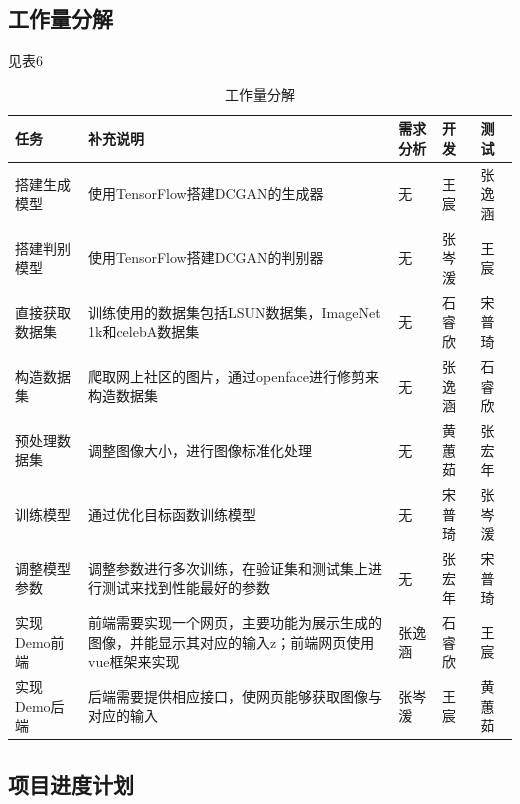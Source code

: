 \documentclass[hyperref, a4paper]{ctexart}
\begin{document}
\hypertarget{ux5de5ux4f5cux91cfux5206ux89e3}{%
\subsection{工作量分解}\label{ux5de5ux4f5cux91cfux5206ux89e3}}

见表6

\begin{table}
    \caption{工作量分解}
    \centering
    \begin{tabular}{|p{3.0cm}<{\centering}|p{5.0cm}<{\centering}|p{1.5cm}<{\centering}|p{1.5cm}<{\centering}|p{1.5cm}<{\centering}|}
    \hline
    任务       & 补充说明                                               & 需求分析 & 开发  & 测试  \\ \hline
    搭建生成模型   & 使用TensorFlow搭建DCGAN的生成器                            & 无    & 王宸  & 张逸涵 \\ \hline
    搭建判别模型   & 使用TensorFlow搭建DCGAN的判别器                            & 无    & 张岑湲 & 王宸  \\ \hline
    直接获取数据集  & 训练使用的数据集包括LSUN数据集，ImageNet 1k和celebA数据集            & 无    & 石睿欣 & 宋普琦 \\ \hline
    构造数据集    & 爬取网上社区的图片，通过openface进行修剪来构造数据集                     & 无    & 张逸涵 & 石睿欣 \\ \hline
    预处理数据集   & 调整图像大小，进行图像标准化处理                                   & 无    & 黄蕙茹 & 张宏年 \\ \hline
    训练模型     & 通过优化目标函数训练模型                                       & 无    & 宋普琦 & 张岑湲 \\ \hline
    调整模型参数   & 调整参数进行多次训练，在验证集和测试集上进行测试来找到性能最好的参数                 & 无    & 张宏年 & 宋普琦 \\ \hline
    实现Demo前端 & 前端需要实现一个网页，主要功能为展示生成的图像，并能显示其对应的输入z；前端网页使用vue框架来实现 & 张逸涵  & 石睿欣 & 王宸  \\ \hline
    实现Demo后端 & 后端需要提供相应接口，使网页能够获取图像与对应的输入                         & 张岑湲  & 王宸  & 黄蕙茹 \\ \hline
    \end{tabular}
\end{table}

\hypertarget{ux9879ux76eeux8fdbux5ea6ux8ba1ux5212}{%
\subsection{项目进度计划}\label{ux9879ux76eeux8fdbux5ea6ux8ba1ux5212}}
\end{document}
